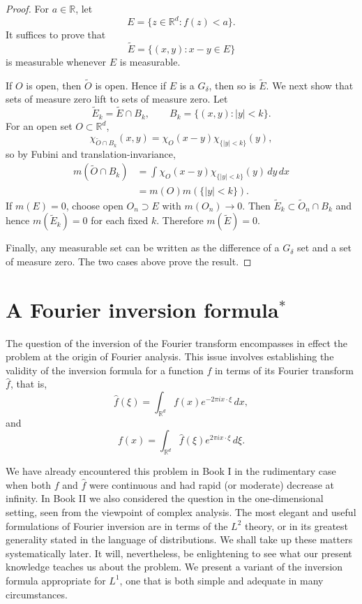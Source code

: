\documentclass[11pt,openany]{book}
\begin{document}
\begin{proof}
For $a\in\mathbb{R}$, let
\[
E=\{z\in\mathbb{R}^d:f(z)<a\}.
\]
It suffices to prove that
\[
\widetilde E=\{(x,y):x-y\in E\}
\]
is measurable whenever $E$ is measurable.

If $O$ is open, then $\widetilde O$ is open. Hence if $E$ is a $G_\delta$, then so is $\widetilde E$. We next show that sets of measure zero lift to sets of measure zero. Let
\[
\widetilde E_k=\widetilde E\cap B_k,
\qquad B_k=\{(x,y):|y|<k\}.
\]
For an open set $O\subset\mathbb{R}^d$,
\[
\chi_{\widetilde O\cap B_k}(x,y)=\chi_O(x-y)\chi_{\{|y|<k\}}(y),
\]
so by Fubini and translation-invariance,
\begin{align*}
m(\widetilde O\cap B_k)
&=\int\chi_O(x-y)\chi_{\{|y|<k\}}(y)\,dy\,dx\\
&=m(O)m(\{|y|<k\}).
\end{align*}
If $m(E)=0$, choose open $O_n\supset E$ with $m(O_n)\to0$. Then $\widetilde E_k\subset\widetilde O_n\cap B_k$ and hence $m(\widetilde E_k)=0$ for each fixed $k$. Therefore $m(\widetilde E)=0$.

Finally, any measurable set can be written as the difference of a $G_\delta$ set and a set of measure zero. The two cases above prove the result.
\end{proof}

\section{A Fourier inversion formula${}^*$}

The question of the inversion of the Fourier transform encompasses in effect the problem at the origin of Fourier analysis. This issue involves establishing the validity of the inversion formula for a function $f$ in terms of its Fourier transform $\widehat f$, that is,
\begin{equation}
\widehat f(\xi)=\int_{\mathbb{R}^d}f(x)e^{-2\pi i x\cdot\xi}\,dx,
\tag{14}
\end{equation}
and
\begin{equation}
f(x)=\int_{\mathbb{R}^d}\widehat f(\xi)e^{2\pi i x\cdot\xi}\,d\xi.
\tag{15}
\end{equation}

We have already encountered this problem in Book I in the rudimentary case when both $f$ and $\widehat f$ were continuous and had rapid (or moderate) decrease at infinity. In Book II we also considered the question in the one-dimensional setting, seen from the viewpoint of complex analysis. The most elegant and useful formulations of Fourier inversion are in terms of the $L^2$ theory, or in its greatest generality stated in the language of distributions. We shall take up these matters systematically later. It will, nevertheless, be enlightening to see what our present knowledge teaches us about the problem. We present a variant of the inversion formula appropriate for $L^1$, one that is both simple and adequate in many circumstances.
\end{document}
